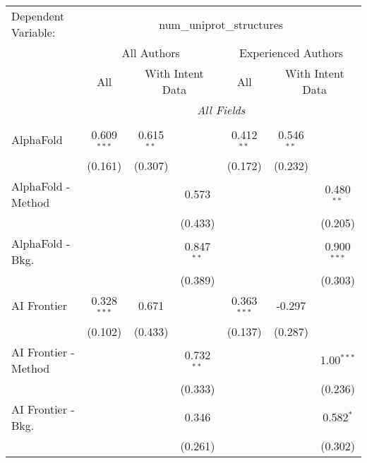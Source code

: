\begingroup
\centering
\begin{tabular}{lcccccc}
   \tabularnewline \midrule \midrule
   Dependent Variable: & \multicolumn{6}{c}{num\_uniprot\_structures}\\
 & \multicolumn{3}{c}{All Authors} & \multicolumn{3}{c}{Experienced Authors} \\
\cmidrule(lr){2-4} \cmidrule(lr){5-7}
 & \multicolumn{1}{c}{All} & \multicolumn{2}{c}{With Intent Data} & \multicolumn{1}{c}{All} & \multicolumn{2}{c}{With Intent Data} \\
\cmidrule(lr){2-2} \cmidrule(lr){3-4} \cmidrule(lr){5-5} \cmidrule(lr){6-7}
 & \multicolumn{6}{c}{\textit{All Fields}} \\ \\
   AlphaFold            & 0.609$^{***}$ & 0.615$^{**}$ &              & 0.412$^{**}$  & 0.546$^{**}$ &   \\   
                        & (0.161)       & (0.307)      &              & (0.172)       & (0.232)      &   \\   
   AlphaFold - Method   &               &              & 0.573        &               &              & 0.480$^{**}$\\   
                        &               &              & (0.433)      &               &              & (0.205)\\   
   AlphaFold - Bkg.     &               &              & 0.847$^{**}$ &               &              & 0.900$^{***}$\\   
                        &               &              & (0.389)      &               &              & (0.303)\\   
   AI Frontier          & 0.328$^{***}$ & 0.671        &              & 0.363$^{***}$ & -0.297       &   \\   
                        & (0.102)       & (0.433)      &              & (0.137)       & (0.287)      &   \\   
   AI Frontier - Method &               &              & 0.732$^{**}$ &               &              & 1.00$^{***}$\\   
                        &               &              & (0.333)      &               &              & (0.236)\\   
   AI Frontier - Bkg.   &               &              & 0.346        &               &              & 0.582$^{*}$\\   
                        &               &              & (0.261)      &               &              & (0.302)\\   

\end{tabular}
